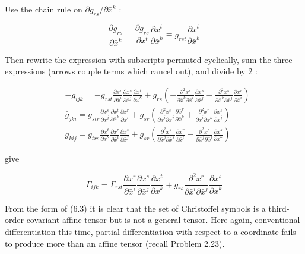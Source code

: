 \documentclass[10pt]{article}
\begin{document}
Use the chain rule on $\partial g_{r s} / \partial \bar{x}^{k}$ :

$$
\frac{\partial g_{r s}}{\partial \bar{x}^{\bar{k}}}=\frac{\partial g_{r s}}{\partial x^{t}} \frac{\partial x^{t}}{\partial \bar{x}^{k}} \equiv g_{r s t} \frac{\partial x^{t}}{\partial \bar{x}^{k}}
$$

Then rewrite the expression with subscripts permuted cyclically, sum the three expressions (arrows couple terms which cancel out), and divide by 2 :

$$
\begin{aligned}
& -\bar{g}_{i j k}=-g_{r s t} \frac{\partial x^{r}}{\partial \bar{x}^{i}} \frac{\partial x^{s}}{\partial \bar{x}^{j}} \frac{\partial x^{t}}{\partial \bar{x}^{k}}+g_{r s}\left(-\frac{\partial^{2} x^{r}}{\partial \bar{x}^{k} \partial \bar{x}^{i}} \frac{\partial x^{s}}{\partial \bar{x}^{j}}-\frac{\partial^{2} x^{s}}{\partial \bar{x}^{k} \partial \bar{x}^{j}} \frac{\partial x^{r}}{\partial \bar{x}^{i}}\right) \\
& \bar{g}_{j k i}=g_{s t r} \frac{\partial x^{s}}{\partial \bar{x}^{j}} \frac{\partial x^{t}}{\partial \bar{x}^{k}} \frac{\partial x^{r}}{\partial \bar{x}^{i}}+g_{s r}\left(\frac{\partial^{2} x^{s}}{\partial \bar{x}^{i} \partial \bar{x}^{j}} \frac{\partial \bar{x}^{r}}{\partial \bar{x}^{k}}+\frac{\partial^{2} x^{r}}{\partial \bar{x}^{i} \partial \bar{x}^{k}} \frac{\partial x^{s}}{\partial \bar{x}^{j}}\right) \\
& \bar{g}_{k i j}=g_{t r s} \frac{\partial x^{t}}{\partial \bar{x}^{k}} \frac{\partial x^{r}}{\partial \bar{x}^{i}} \frac{\partial x^{s}}{\partial \bar{x}^{j}}+g_{s r}\left(\frac{\partial^{2} x^{s}}{\partial \bar{x}^{j} \partial \bar{x}^{k}} \frac{\partial x^{r}}{\partial \bar{x}^{i}}+\frac{\partial^{2} x^{r}}{\partial \bar{x}^{j} \partial \bar{x}^{i}} \frac{\partial x^{s}}{\partial \bar{x}^{k}}\right)
\end{aligned}
$$

give


\begin{equation*}
\bar{\Gamma}_{i j k}=\Gamma_{r s t} \frac{\partial x^{r}}{\partial \bar{x}^{i}} \frac{\partial x^{s}}{\partial \bar{x}^{j}} \frac{\partial x^{t}}{\partial \bar{x}^{k}}+g_{r s} \frac{\partial^{2} x^{r}}{\partial \bar{x}^{i} \partial \bar{x}^{j}} \frac{\partial x^{s}}{\partial \bar{x}^{k}} \tag{6.3}
\end{equation*}


From the form of (6.3) it is clear that the set of Christoffel symbols is a third-order covariant affine tensor but is not a general tensor. Here again, conventional differentiation-this time, partial differentiation with respect to a coordinate-fails to produce more than an affine tensor (recall Problem 2.23).
\end{document}
